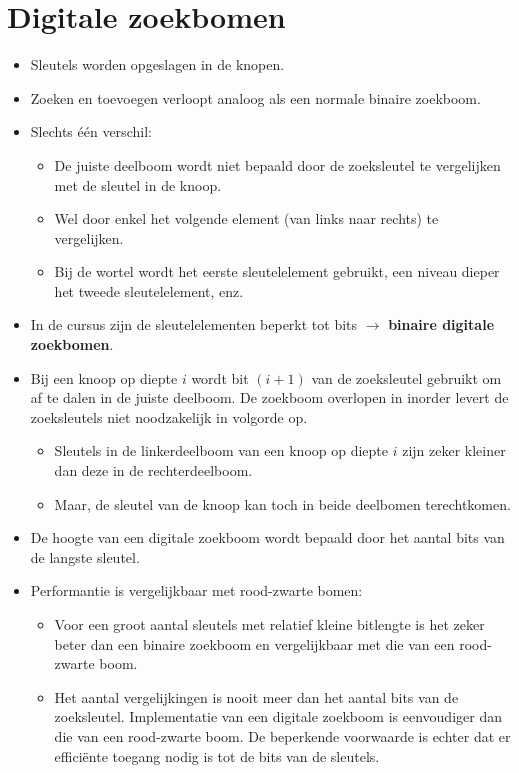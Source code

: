 \section{Digitale zoekbomen}
\begin{itemize}
    \item Sleutels worden opgeslagen in de knopen.
    \item Zoeken en toevoegen verloopt analoog als een normale binaire zoekboom.
    \item Slechts één verschil: 
    \begin{itemize}
        \item De juiste deelboom wordt niet bepaald door de zoeksleutel te vergelijken met de sleutel in de knoop.
        \item Wel door enkel het volgende element (van links naar rechts) te vergelijken.
        \item Bij de wortel wordt het eerste sleutelelement gebruikt, een niveau dieper het tweede sleutelelement, enz.
    \end{itemize}
    \item In de cursus zijn de sleutelelementen beperkt tot bits $\rightarrow$ \textbf{binaire digitale zoekbomen}.
    \item Bij een knoop op diepte $i$ wordt bit $(i + 1)$ van de zoeksleutel gebruikt om af te dalen in de juiste deelboom.
    \alert De zoekboom overlopen in inorder levert de zoeksleutels niet noodzakelijk in volgorde op.
    \begin{itemize}
        \item Sleutels in de linkerdeelboom van een knoop op diepte $i$ zijn zeker kleiner dan deze in de rechterdeelboom.
        \item Maar, de sleutel van de knoop kan toch in beide deelbomen terechtkomen.
    \end{itemize}
    \item De hoogte van een digitale zoekboom wordt bepaald door het aantal bits van de langste sleutel.
    \item Performantie is vergelijkbaar met rood-zwarte bomen:
    \begin{itemize}
        \item Voor een groot aantal sleutels met relatief kleine bitlengte is het zeker beter dan een binaire zoekboom en vergelijkbaar met die van een rood-zwarte boom.
        \item Het aantal vergelijkingen is nooit meer dan het aantal bits van de zoeksleutel.
        \good Implementatie van een digitale zoekboom is eenvoudiger dan die van een rood-zwarte boom.
        \alert De beperkende voorwaarde is echter dat er efficiënte toegang nodig is tot de bits van de sleutels.
    \end{itemize}
\end{itemize}

